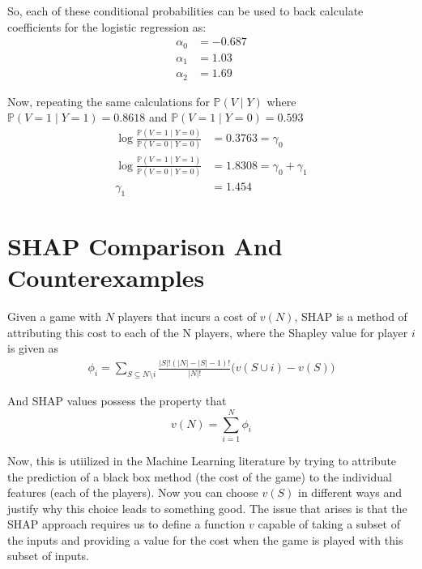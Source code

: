 \documentclass{article}
\begin{document}
So, each of these conditional probabilities can be used to back calculate coefficients for the logistic regression as:
\begin{align*}
\alpha_0 &= -0.687\\
\alpha_1 &= 1.03\\
\alpha_2 &= 1.69
\end{align*}


Now, repeating the same calculations for $\mathbb{P}(V \mid Y)$ where $\mathbb{P}(V = 1 \mid Y = 1) = 0.8618$ and $\mathbb{P}(V = 1 \mid Y = 0) = 0.593$
\begin{align*}
\log{\frac{\mathbb{P}(V = 1 \mid Y = 0)}{\mathbb{P}(V = 0 \mid Y = 0)}} &= 0.3763 = \gamma_0\\
\log{\frac{\mathbb{P}(V = 1 \mid Y = 1)}{\mathbb{P}(V = 0 \mid Y = 0)}} &= 1.8308 = \gamma_0 + \gamma_1\\
\gamma_1 &= 1.454
\end{align*}

\section{SHAP Comparison And Counterexamples}

Given a game with $N$ players that incurs a cost of $v(N)$, SHAP is a method of attributing this cost to each of the N players, where the Shapley value for player $i$ is given as
\begin{align*}
\phi_i = \sum_{S \subseteq N \setminus i} \frac{|S|!(|N| - |S| - 1)!}{|N|!}\Big(v(S \cup i) - v(S) \Big)
\end{align*}

And SHAP values possess the property that 
\[
v(N) = \sum_{i = 1}^N \phi_i
\]

Now, this is utiilized in the Machine Learning literature by trying to attribute the prediction of a black box method (the cost of the game) to the individual features (each of the players). Now you can choose $v(S)$ in different ways and justify why this choice leads to something good. The issue that arises is that the SHAP approach requires us to define a function $v$ capable of taking a subset of the inputs and providing a value for the cost when the game is played with this subset of inputs.
\end{document}
